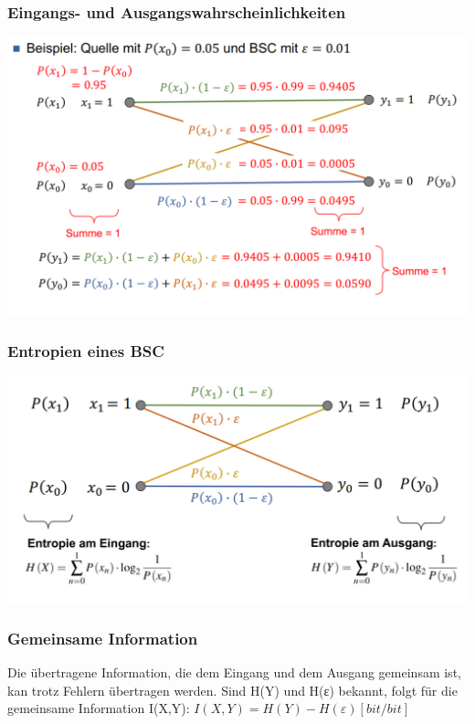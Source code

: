 \subsubsection{Eingangs- und Ausgangswahrscheinlichkeiten}%

\begin{center}
    \includegraphics[width=1\linewidth]{images/einauswahrscheinlichkeit.png}
\end{center}

\subsubsection{Entropien eines BSC}%

\begin{center}
    \includegraphics[width=1\linewidth]{images/bscentropy.png}
\end{center}

\subsubsection{Gemeinsame Information}%
Die übertragene Information, die dem Eingang und dem Ausgang gemeinsam ist, kan trotz Fehlern übertragen werden. Sind H(Y) und H(ε) bekannt, folgt für die gemeinsame Information I(X,Y): \textbf{$I(X,Y) = H(Y) - H(\varepsilon) [bit/bit]$}

